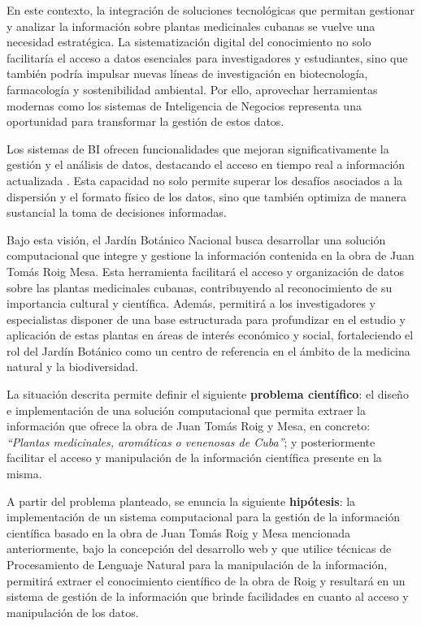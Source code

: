 En este contexto, la integración de soluciones tecnológicas que permitan gestionar y 
analizar la información sobre plantas medicinales cubanas se vuelve una necesidad 
estratégica. La sistematización digital del conocimiento no solo facilitaría el acceso 
a datos esenciales para investigadores y estudiantes, sino que también podría impulsar 
nuevas líneas de investigación en biotecnología, farmacología y sostenibilidad ambiental. 
Por ello, aprovechar herramientas modernas como los sistemas de Inteligencia de Negocios 
representa una oportunidad para transformar la gestión de estos datos.

Los sistemas de BI ofrecen funcionalidades que mejoran significativamente la gestión 
y el análisis de datos, destacando el acceso en tiempo real a información actualizada \cite{IbmBI}. 
Esta capacidad no solo permite superar los desafíos asociados a la dispersión y 
el formato físico de los datos, sino que también optimiza de manera sustancial 
la toma de decisiones informadas.

Bajo esta visión, el Jardín Botánico Nacional busca desarrollar una solución computacional 
que integre y gestione la información contenida en la obra de Juan Tomás Roig Mesa. 
Esta herramienta facilitará el acceso y organización de datos sobre las plantas medicinales 
cubanas, contribuyendo al reconocimiento de su importancia cultural y científica. 
Además, permitirá a los investigadores y especialistas disponer de una base estructurada 
para profundizar en el estudio y aplicación de estas plantas en áreas de interés 
económico y social, fortaleciendo el rol del Jardín Botánico como un centro 
de referencia en el ámbito de la medicina natural y la biodiversidad.

La situación descrita permite definir el siguiente \textbf{problema científico}: 
el diseño e implementación de una solución computacional que permita extraer 
la información que ofrece la obra de Juan Tomás Roig y Mesa, en concreto: 
\textit{``Plantas medicinales, aromáticas o venenosas de Cuba''}; y posteriormente 
facilitar el acceso y manipulación de la información científica presente en la misma. 

A partir del problema planteado, se enuncia la siguiente \textbf{hipótesis}: 
la implementación de un sistema computacional para la gestión de la información 
científica basado en la obra de Juan Tomás Roig y Mesa mencionada anteriormente, 
bajo la concepción del desarrollo web y que utilice técnicas de Procesamiento de 
Lenguaje Natural para la manipulación de la información, permitirá extraer el 
conocimiento científico de la obra de Roig y resultará en un sistema de gestión de 
la información que brinde facilidades en cuanto al acceso y manipulación de los datos. 

